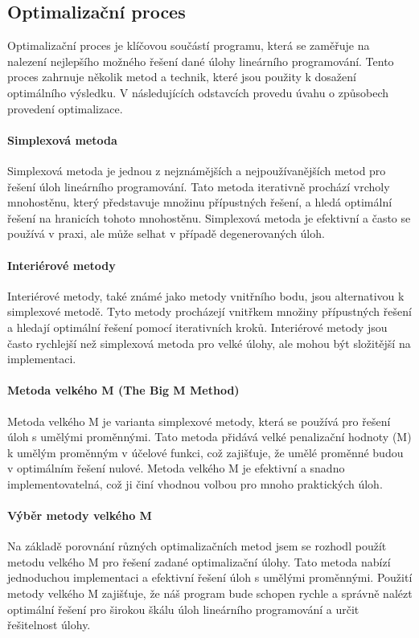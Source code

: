 \documentclass[czech, sem, kiv, he, pdf, viewonly]{fasthesis}
\begin{document}
\subsection{Optimalizační proces}
Optimalizační proces je klíčovou součástí programu, která se zaměřuje na nalezení nejlepšího možného řešení dané úlohy lineárního programování. Tento proces zahrnuje několik metod a technik, které jsou použity k dosažení optimálního výsledku. V následujících odstavcích provedu úvahu o způsobech provedení optimalizace.

\paragraph{Simplexová metoda}
Simplexová metoda je jednou z nejznámějších a nejpoužívanějších metod pro řešení úloh lineárního programování. Tato metoda iterativně prochází vrcholy mnohostěnu, který představuje množinu přípustných řešení, a hledá optimální řešení na hranicích tohoto mnohostěnu. Simplexová metoda je efektivní a často se používá v praxi, ale může selhat v případě degenerovaných úloh.

\paragraph{Interiérové metody}
Interiérové metody, také známé jako metody vnitřního bodu, jsou alternativou k simplexové metodě. Tyto metody procházejí vnitřkem množiny přípustných řešení a hledají optimální řešení pomocí iterativních kroků. Interiérové metody jsou často rychlejší než simplexová metoda pro velké úlohy, ale mohou být složitější na implementaci.

\paragraph{Metoda velkého M (The Big M Method)}
Metoda velkého M je varianta simplexové metody, která se používá pro řešení úloh s umělými proměnnými. Tato metoda přidává velké penalizační hodnoty (M) k umělým proměnným v účelové funkci, což zajišťuje, že umělé proměnné budou v optimálním řešení nulové. Metoda velkého M je efektivní a snadno implementovatelná, což ji činí vhodnou volbou pro mnoho praktických úloh.

\paragraph{Výběr metody velkého M}
Na základě porovnání různých optimalizačních metod jsem se rozhodl použít metodu velkého M pro řešení zadané optimalizační úlohy. Tato metoda nabízí jednoduchou implementaci a efektivní řešení úloh s umělými proměnnými. Použití metody velkého M zajišťuje, že náš program bude schopen rychle a správně nalézt optimální řešení pro širokou škálu úloh lineárního programování a určit řešitelnost úlohy.
%
%
%
%
%
%
\end{document}
